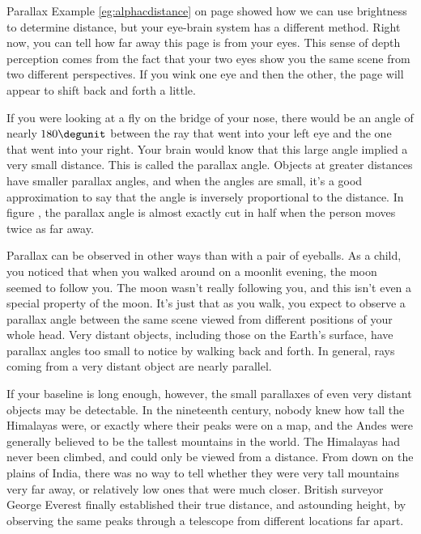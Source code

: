 \begin{envsubsection}{Parallax}
Example \ref{eg:alphacdistance} on page \pageref{eg:alphacdistance} showed how we
can use brightness to determine distance, but your eye-brain system has a different method.
Right now, you can tell how far away this page is from your eyes. This sense of
depth perception comes from the fact that your two eyes show you the same scene
from two different perspectives. If you wink one eye and then the other, the page will
appear to shift back and forth a little.

If you were looking at a fly on the bridge
of your nose, there would be an angle of nearly $180\degunit$ between the ray that
went into your left eye and the one that went into your right. Your brain would know
that this large angle implied a very small distance. This is called the parallax
angle. Objects at greater distances have smaller parallax angles, and when the angles
are small, it's a good approximation to say that the angle is inversely proportional
to the distance. In figure , the parallax angle is almost exactly
cut in half when the person moves twice as far away.

Parallax can be observed in other ways than with a pair of eyeballs.
As a child, you noticed that when you walked around on a moonlit evening,
the moon seemed to follow you. The moon wasn't really following you, and this isn't
even a special property of the moon. It's just that as you walk, you expect to observe
a parallax angle between the same scene viewed from different positions of your whole head.
Very distant objects, including those on the Earth's surface, have parallax
angles too small to notice by walking back and forth. In general, rays coming from
a very distant object are nearly parallel.

If your baseline is long enough, however, the small parallaxes of even very distant objects
may be detectable. In the nineteenth century, nobody knew how tall the Himalayas were,
or exactly where their peaks were on a map, and the Andes were generally believed to be the
tallest mountains in the world. The Himalayas had never been climbed, and could only be viewed
from a distance. From down on the plains of India, there was no way to tell whether they were
very tall mountains very far away, or relatively low ones that were much closer. British
surveyor George Everest finally established their true distance, and astounding height,
by observing the same peaks through a telescope from different locations far apart.


\end{envsubsection}
